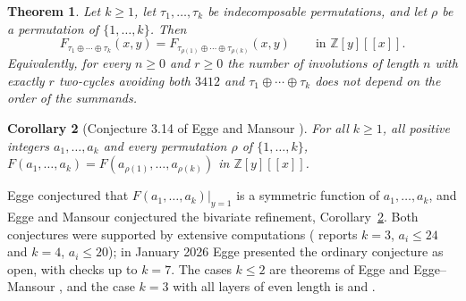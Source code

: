 \documentclass[11pt]{amsart}
\newtheorem{theorem}{Theorem}[section]
\newtheorem{corollary}[theorem]{Corollary}
\theoremstyle{definition}
\newcommand{\Z}{\mathbb{Z}}
\newcommand{\ds}{\oplus}
\begin{document}
\begin{theorem}\label{thm:main}
Let $k\ge1$, let $\tau_1,\dots,\tau_k$ be indecomposable permutations, and let $\rho$ be a permutation of $\{1,\dots,k\}$. Then
\[
F_{\tau_1\ds\cdots\ds\tau_k}(x,y)=F_{\tau_{\rho(1)}\ds\cdots\ds\tau_{\rho(k)}}(x,y)\qquad\text{in }\Z[y][[x]].
\]
Equivalently, for every $n\ge0$ and $r\ge0$ the number of involutions of length $n$ with exactly $r$ two-cycles avoiding both $3412$ and $\tau_1\ds\cdots\ds\tau_k$ does not depend on the order of the summands.
\end{theorem}

\begin{corollary}[Conjecture 3.14 of Egge and Mansour \cite{EggeMansour2006}]\label{cor:EM}
For all $k\ge1$, all positive integers $a_1,\dots,a_k$ and every permutation $\rho$ of $\{1,\dots,k\}$, $F(a_1,\dots,a_k)=F(a_{\rho(1)},\dots,a_{\rho(k)})$ in $\Z[y][[x]]$.
\end{corollary}

Egge \cite[Conjecture 6.9]{Egge2004} conjectured that $F(a_1,\dots,a_k)|_{y=1}$ is a symmetric function of $a_1,\dots,a_k$, and Egge and Mansour \cite[Conjecture 3.14]{EggeMansour2006} conjectured the bivariate refinement, Corollary~\ref{cor:EM}. Both conjectures were supported by extensive computations (\cite{EggeMansour2006} reports $k=3$, $a_i\le24$ and $k=4$, $a_i\le20$); in January 2026 Egge \cite{EggeSlides2026} presented the ordinary conjecture as open, with checks up to $k=7$. The cases $k\le2$ are theorems of Egge \cite[Theorem 6.7]{Egge2004} and Egge--Mansour \cite[Theorems 3.12--3.13]{EggeMansour2006}, and the case $k=3$ with all layers of even length is \cite[Eq.~(44)]{Egge2004} and \cite[Eq.~(18)]{EggeMansour2006}.
\end{document}
